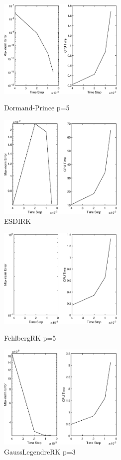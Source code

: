 \documentclass[12]{article}%
\begin{document}
\begin{figure}[H]
    \centering
    \begin{minipage}[t]{0.48\textwidth}
    \centering
    \includegraphics[width=6cm]{../pic/DormandPrinceRK5test2.eps}
    \caption{Dormand-Prince p=5}
    \end{minipage}
    \begin{minipage}[t]{0.48\textwidth}
    \centering
    \includegraphics[width=6cm]{../pic/ESDIRK5test2.eps}
    \caption{ESDIRK}
    \end{minipage}
\end{figure}
\begin{figure}[H]
    \centering
    \begin{minipage}[t]{0.48\textwidth}
    \centering
    \includegraphics[width=6cm]{../pic/FehlbergRK5test2.eps}
    \caption{FehlbergRK p=5}
    \end{minipage}
    \begin{minipage}[t]{0.48\textwidth}
    \centering
    \includegraphics[width=6cm]{../pic/GaussLegendreRK3test2.eps}
    \caption{GaussLegendreRK p=3}
    \end{minipage}
\end{figure}
\end{document}
